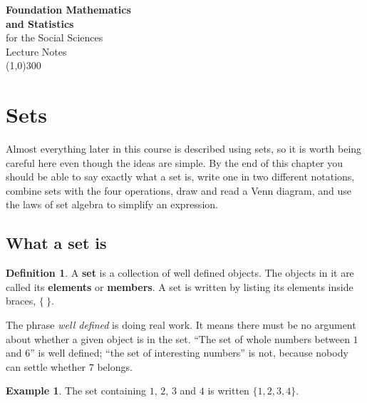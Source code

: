 \documentclass[11pt,a4paper]{article}
\theoremstyle{definition}
\newtheorem{definition}[thm]{Definition}
\newtheorem{example}[thm]{Example}
\begin{document}
\begin{titlepage}
\begin{center}
\vspace*{4cm}
{\Huge\bfseries Foundation Mathematics}\\[0.45cm]
{\Huge\bfseries and Statistics}\\[0.9cm]
{\Large for the Social Sciences}\\[1.2cm]
{\large Lecture Notes}\\[3cm]
\line(1,0){300}
\end{center}
\end{titlepage}

\tableofcontents
\thispagestyle{empty}
\clearpage
\setcounter{page}{1}


\section{Sets}

Almost everything later in this course is described using sets, so it is worth
being careful here even though the ideas are simple. By the end of this chapter you
should be able to say exactly what a set is, write one in two different notations,
combine sets with the four operations, draw and read a Venn diagram, and use the
laws of set algebra to simplify an expression.

\subsection{What a set is}

\begin{definition}
A \textbf{set} is a collection of well defined objects. The objects in it are
called its \textbf{elements} or \textbf{members}. A set is written by listing its
elements inside braces, $\{\ \}$.
\end{definition}

The phrase \emph{well defined} is doing real work. It means there must be no
argument about whether a given object is in the set. ``The set of whole numbers
between $1$ and $6$'' is well defined; ``the set of interesting numbers'' is not,
because nobody can settle whether $7$ belongs.

\begin{example}
The set containing $1$, $2$, $3$ and $4$ is written $\{1,2,3,4\}$.
\end{example}
\end{document}
